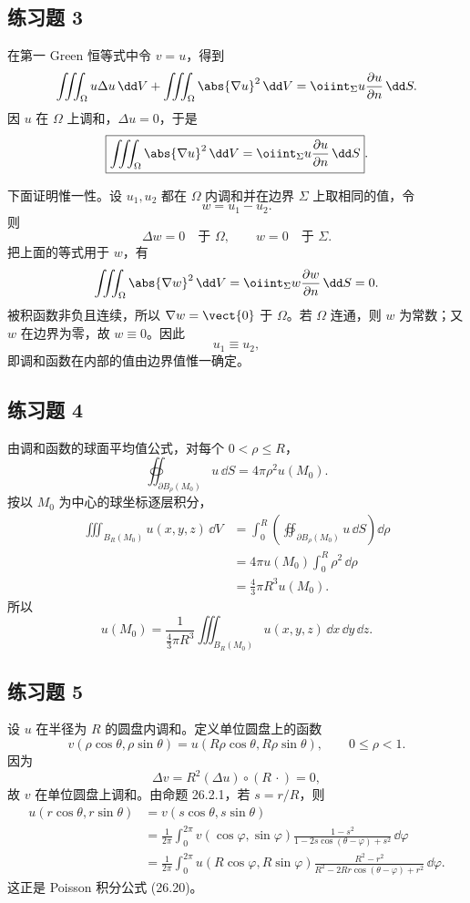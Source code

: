 \subsection*{练习题 3}
\begin{xsolution}
在第一 Green 恒等式中令 $v=u$，得到
\[
  \iiint_\Omega u\Delta u\,\dd V
  +\iiint_\Omega\abs{\nabla u}^2\,\dd V
  =\oiint_\Sigma u\frac{\partial u}{\partial n}\,\dd S.
\]
因 $u$ 在 $\Omega$ 上调和，$\Delta u=0$，于是
\[
  \boxed{
  \iiint_\Omega\abs{\nabla u}^2\,\dd V
  =\oiint_\Sigma u\frac{\partial u}{\partial n}\,\dd S
  }.
\]

下面证明惟一性。设 $u_1,u_2$ 都在 $\Omega$ 内调和并在边界 $\Sigma$ 上取相同的值，令
\[
  w=u_1-u_2.
\]
则
\[
  \Delta w=0\quad\text{于 }\Omega,
  \qquad
  w=0\quad\text{于 }\Sigma.
\]
把上面的等式用于 $w$，有
\[
  \iiint_\Omega\abs{\nabla w}^2\,\dd V
  =\oiint_\Sigma w\frac{\partial w}{\partial n}\,\dd S=0.
\]
被积函数非负且连续，所以 $\nabla w=\vect{0}$ 于 $\Omega$。若 $\Omega$ 连通，则 $w$ 为常数；又 $w$ 在边界为零，故 $w\equiv0$。因此
\[
  u_1\equiv u_2,
\]
即调和函数在内部的值由边界值惟一确定。
\end{xsolution}

\subsection*{练习题 4}
\begin{xsolution}
由调和函数的球面平均值公式，对每个 $0<\rho\le R$，
\[
  \oiint_{\partial B_\rho(M_0)}u\,\dd S
  =4\pi\rho^2u(M_0).
\]
按以 $M_0$ 为中心的球坐标逐层积分，
\begin{align*}
  \iiint_{B_R(M_0)}u(x,y,z)\,\dd V
  &=\int_0^R\left(
    \oiint_{\partial B_\rho(M_0)}u\,\dd S
    \right)\dd\rho\\
  &=4\pi u(M_0)\int_0^R\rho^2\,\dd\rho\\
  &=\frac{4}{3}\pi R^3u(M_0).
\end{align*}
所以
\[
  \boxed{
  u(M_0)=\frac{1}{\frac43\pi R^3}
  \iiint_{B_R(M_0)}u(x,y,z)\,\dd x\,\dd y\,\dd z
  }.
\]
\end{xsolution}

\subsection*{练习题 5}
\begin{xsolution}
设 $u$ 在半径为 $R$ 的圆盘内调和。定义单位圆盘上的函数
\[
  v(\rho\cos\theta,\rho\sin\theta)
  =u(R\rho\cos\theta,R\rho\sin\theta),
  \qquad 0\le\rho<1.
\]
因为
\[
  \Delta v=R^2(\Delta u)\circ(R\,\cdot)=0,
\]
故 $v$ 在单位圆盘上调和。由命题 26.2.1，若 $s=r/R$，则
\begin{align*}
  u(r\cos\theta,r\sin\theta)
  &=v(s\cos\theta,s\sin\theta)\\
  &=\frac{1}{2\pi}\int_0^{2\pi}
    v(\cos\varphi,\sin\varphi)
    \frac{1-s^2}{1-2s\cos(\theta-\varphi)+s^2}\,\dd\varphi\\
  &=\frac{1}{2\pi}\int_0^{2\pi}
    u(R\cos\varphi,R\sin\varphi)
    \frac{R^2-r^2}{R^2-2Rr\cos(\theta-\varphi)+r^2}\,\dd\varphi.
\end{align*}
这正是 Poisson 积分公式 (26.20)。
\end{xsolution}

